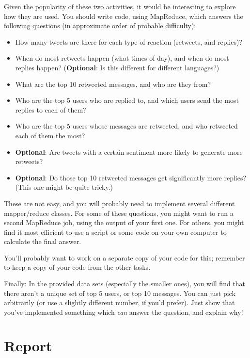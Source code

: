 \documentclass[a4paper,10pt]{article}
\begin{document}
  Given the popularity of these two activities, it would be interesting to explore how they are used. You should write code, using MapReduce,
  which answers the following questions (in approximate order of probable difficulty):

  \begin{itemize}
  \item How many tweets are there for each type of reaction (retweets, and replies)?
  \item When do most retweets happen (what times of day), and when do most replies happen? (\textbf{Optional}: Is this different for different languages?)
  \item What are the top 10 retweeted messages, and who are they from?
  \item Who are the top 5 users who are replied to, and which users send the most replies to each of them?
  \item Who are the top 5 users whose messages are retweeted, and who retweeted each of them the most?
  \item \textbf{Optional}: Are tweets with a certain sentiment more likely to generate more retweets?
  \item \textbf{Optional}: Do those top 10 retweeted messages get significantly more replies? (This one might be quite tricky.)
  \end{itemize}

  These are not easy, and you will probably need to implement several different mapper/reduce classes. For some of these questions, you might want to run a second MapReduce job, using the output of your first one. For others, you might find it most efficient to use a script or some code on your own computer to calculate the final answer.

  You'll probably want to work on a separate copy of your code for this; remember to keep a copy of your code from the other tasks.

  Finally: In the provided data sets (especially the smaller ones), you will find that there aren't a unique set of top 5 users, or top 10 messages.
  You can just pick arbitrarily (or use a slightly different number, if you'd prefer). Just show that you've implemented something which \emph{can}
  answer the question, and explain why!

  \pagebreak
  \section{Report} \label{sec:report}
\end{document}
